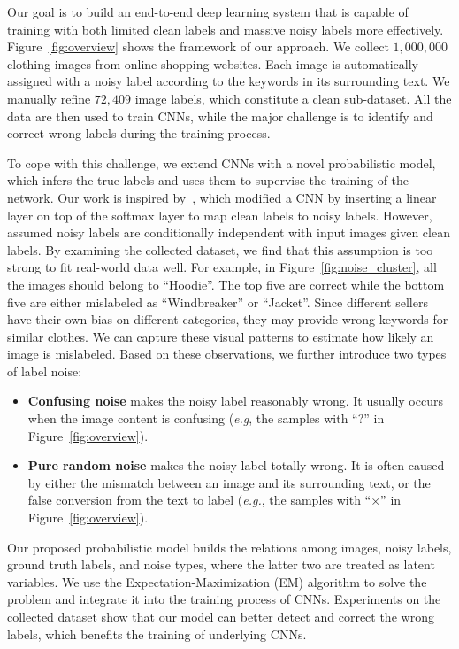 \documentclass[extendedabs]{bmvc2k}
\begin{document}
Our goal is to build an end-to-end deep learning system that is capable of training with both limited clean labels and massive noisy labels more effectively. Figure~\ref{fig:overview} shows the framework of our approach. We collect $1,000,000$ clothing images from online shopping websites. Each image is automatically assigned with a noisy label according to the keywords in its surrounding text. We manually refine $72,409$ image labels, which constitute a clean sub-dataset. All the data are then used to train CNNs, while the major challenge is to identify and correct wrong labels during the training process.

To cope with this challenge, we extend CNNs with a novel probabilistic model, which infers the true labels and uses them to supervise the training of the network. Our work is inspired by~\cite{sukhbaatar2014learning}, which modified a CNN by inserting a linear layer on top of the softmax layer to map clean labels to noisy labels. However,~\cite{sukhbaatar2014learning} assumed noisy labels are conditionally independent with input images given clean labels. By examining the collected dataset, we find that this assumption is too strong to fit real-world data well. For example, in Figure~\ref{fig:noise_cluster}, all the images should belong to ``Hoodie''. The top five are correct while the bottom five are either mislabeled as ``Windbreaker'' or ``Jacket''. Since different sellers have their own bias on different categories, they may provide wrong keywords for similar clothes. We can capture these visual patterns to estimate how likely an image is mislabeled. Based on these observations, we further introduce two types of label noise:
\begin{itemize}
\item \textbf{Confusing noise} makes the noisy label reasonably wrong. It usually occurs when the image content is confusing (\emph{e.g}, the samples with ``?'' in Figure~\ref{fig:overview}).
\item \textbf{Pure random noise} makes the noisy label totally wrong. It is often caused by either the mismatch between an image and its surrounding text, or the false conversion from the text to label (\emph{e.g.}, the samples with ``$\times$'' in Figure~\ref{fig:overview}).
\end{itemize}

Our proposed probabilistic model builds the relations among images, noisy labels, ground truth labels, and noise types, where the latter two are treated as latent variables. We use the Expectation-Maximization (EM) algorithm to solve the problem and integrate it into the training process of CNNs. Experiments on the collected dataset show that our model can better detect and correct the wrong labels, which benefits the training of underlying CNNs.
\end{document}
